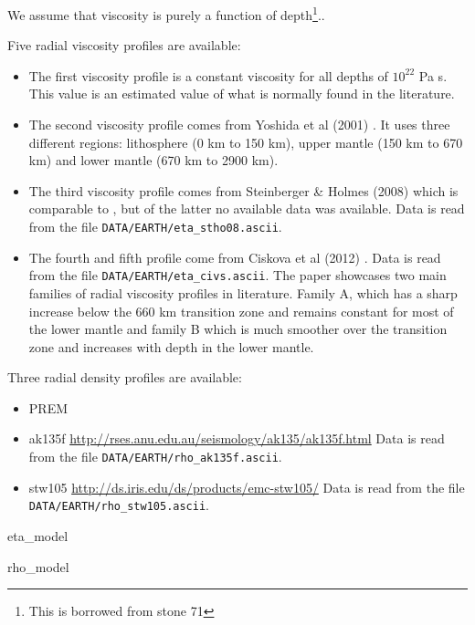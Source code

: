 
We assume that viscosity is purely a function of depth\footnote{This is borrowed
from stone 71}.. 

Five radial viscosity profiles are available:
\begin{itemize}
\item The first viscosity profile is a constant viscosity for all depths of $10^{22}$ Pa s.
This value is an estimated value of what is normally found in the literature. 

\item The second viscosity profile comes from Yoshida et al (2001) \cite{yohk01}. It uses three different regions: lithosphere (0 km to 150 km), upper mantle (150 km to 670 km) and lower mantle (670 km to 2900 km).

\item The third viscosity profile comes from Steinberger \& Holmes (2008) \cite{stho08}
which is comparable to \cite{stca06}, but of the latter no available data was available.
Data is read from the file \texttt{DATA/EARTH/eta\_stho08.ascii}.

\item The fourth and fifth profile come from Ciskova et al (2012) \cite{civs12}.
Data is read from the file \texttt{DATA/EARTH/eta\_civs.ascii}.
The paper showcases two main families of radial viscosity profiles in literature. Family A, which has a sharp
increase below the 660 km transition zone and remains constant for most of the lower mantle
and family B which is much smoother over the transition zone and increases with depth in the lower mantle.

\end{itemize}

Three radial density profiles are available:

\begin{itemize}
\item PREM \cite{dzan81}
\item ak135f \cite{keeb95} \url{http://rses.anu.edu.au/seismology/ak135/ak135f.html}
Data is read from the file \texttt{DATA/EARTH/rho\_ak135f.ascii}.
\item stw105 \cite{kued08} \url{http://ds.iris.edu/ds/products/emc-stw105/}
Data is read from the file \texttt{DATA/EARTH/rho\_stw105.ascii}.
\end{itemize}

{\python eta\_model}

{\python rho\_model}


